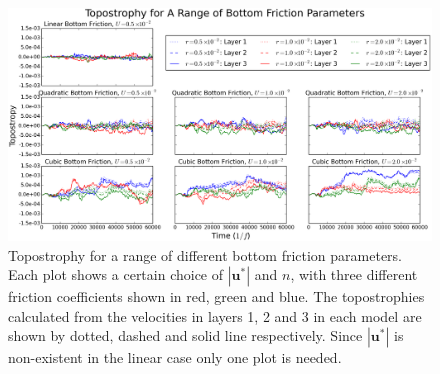 \documentclass[12pt,a4paper]{report}
\begin{document}
  
  \begin{figure}
  	\centering
  	\includegraphics[width=\linewidth]{topostrophy}
  	\caption{Topostrophy for a range of different bottom friction parameters.
  		Each plot shows a certain choice of  $\left|\boldsymbol{u}^{\ast}\right|$
  		and $n$, with three different friction coefficients shown in red, green and blue.
  		The topostrophies calculated from the velocities in layers 1, 2 and 3 in each model
  		are shown by dotted, dashed and solid line respectively. Since 
  		$\left|\boldsymbol{u}^{\ast}\right|$ is non-existent in the linear case only
  		one plot is needed. }
  	\label{fig:topostrophy}
  \end{figure}
  
\end{document}

